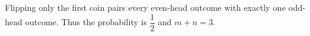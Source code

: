 Flipping only the first coin pairs every even-head outcome with exactly one odd-head outcome. Thus the probability is $\dfrac{1}{2}$ and $\boxed{m+n=3}$.
